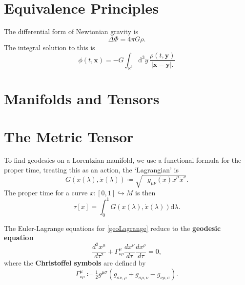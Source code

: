 \documentclass[12pt]{article}
\begin{document}
\section{Equivalence Principles}

\begin{noteEquation}
The differential form of Newtonian gravity is
\begin{equation}
\Delta \Phi = 4 \pi G \rho.
\end{equation}
The integral solution to this is
\begin{equation}
\phi(t,\mathbf{x}) = - G \int_{\mathbb{R}^3} \mathrm{d}^3y \, \frac{
\rho(t,\mathbf{y})
}{
| \mathbf{x} - \mathbf{y}|.
}
\end{equation}
\end{noteEquation}

\section{Manifolds and Tensors}

\section{The Metric Tensor}

\begin{noteEquation}\label{geoLagrange}
To find geodesics on a Lorentzian manifold, we use a functional formula for the proper time, treating this as an action, the `Lagrangian' is
\begin{equation}
G(x(\lambda),\dot{x}(\lambda)) \coloneqq \sqrt{-g_{\mu\nu}(x) \dot{x}^\mu \dot{x}^\nu}.
\end{equation}
The proper time for a curve $x: [0,1] \hookrightarrow M$ is then
\begin{equation}
\tau[x] = \int_0^1 G(x(\lambda),\dot{x}(\lambda)) \mathrm{d}\lambda.
\end{equation}
\end{noteEquation}

\begin{noteEquation}
The Euler-Lagrange equations for \autoref{geoLagrange} reduce to the \textbf{geodesic equation}
\begin{equation}\label{eq:geodesic}
\frac{d^2 x^\mu }{d \tau^2} + \Gamma^\mu_{\nu\rho} \frac{d x^\nu}{d\tau} \frac{dx^\rho}{d\tau} = 0,
\end{equation}
where the \textbf{Christoffel symbols} are defined by
\begin{equation}\label{eq:Christoffel}
\Gamma^\mu_{\nu\rho} \coloneqq \tfrac{1}{2} g^{\mu\sigma} ( g_{\sigma \nu, \rho} + g_{\sigma \rho, \nu} - g_{\nu \rho, \sigma} ).
\end{equation}
\end{noteEquation}
\end{document}
